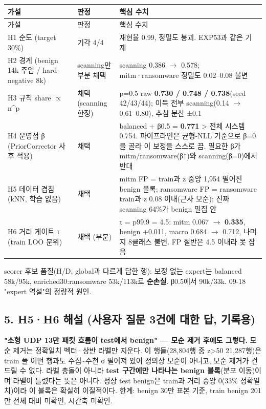 \begingroup
\footnotesize
\begin{longtable}{>{\raggedright\arraybackslash}p{}>{\raggedright\arraybackslash}p{}>{\raggedright\arraybackslash}p{}}
\toprule
가설 & 판정 & 핵심 수치 \\ \midrule
\endfirsthead
가설 & 판정 & 핵심 수치 \\ \midrule
\endhead
{}H1 순도 (target 30\%) & 기각 4/\allowbreak{}4 & 재현율 0.99, 정밀도 붕괴. EXP53과 같은 기제 \\
{}H2 경계 (benign 14k 주입 /\allowbreak{} hard-negative 8k) & scanning만 부분 채택 & scanning 0.386  \ensuremath{\rightarrow}  0.578; mitm·ransomware 정밀도 0.02–0.08 불변 \\
{}H3 규칙 share \ensuremath{\propto} n\textasciicircum{}p & 채택 (scanning 한정) & p=\allowbreak{}0.5 raw \textbf{0.730 /\allowbreak{} 0.748 /\allowbreak{} 0.738}(seed 42/\allowbreak{}43/\allowbreak{}44); 이득 전부 scanning(0.14  \ensuremath{\rightarrow}  0.61–0.80), 추첨 분산 ±0.1 \\
{}H4 운영점 β (PriorCorrector 사후 적용) & 채택 & balanced +\allowbreak{} β0.5 =\allowbreak{} \textbf{0.771} > 전체 시스템 0.754. 파이프라인은 균형-NLL 기준으로 β=\allowbreak{}0을 골라 이 보정을 스스로 끔. 필요한 β가 mitm/\allowbreak{}ransomware(β↑)와 scanning(β=\allowbreak{}0)에서 반대 \\
{}H5 데이터 겹침 (kNN, 학습 없음) & 채택 & mitm FP =\allowbreak{} train과 z 중앙 1,954 떨어진 benign 블록; ransomware FP =\allowbreak{} ransomware train과 z 0.08 이내(근사 모순); 진짜 scanning 64\%가 benign 밀집 안 \\
{}H6 거리 게이트 τ (train LOO 분위) & 채택 (부분) & τ =\allowbreak{} p99.9 =\allowbreak{} 4.5: mitm 0.067  \ensuremath{\rightarrow}  \textbf{0.335}, benign +\allowbreak{}0.011, macro 0.684  \ensuremath{\rightarrow}  0.712, 나머지 8클래스 불변. FP 절반은 4.5 이내라 못 잡음 \\
\bottomrule
\end{longtable}
\endgroup
scorer 후보 품질(H/\allowbreak{}D, global과 다르게 답한 행): 보정 없는 expert는 balanced 58k/\allowbreak{}95k, enriched30:ransomware 53k/\allowbreak{}113k로 \textbf{순손실}. β0.5에서 90k/\allowbreak{}33k. 09-18 "expert 역설"의 정량적 원인.

\subsection{5. H5·H6 해설 (사용자 질문 3건에 대한 답, 기록용)}
\par\noindent \textbullet\enspace \textbf{"소형 UDP 13만 패킷 흐름이 test에서 benign" — 모순 제거 후에도 그렇다.} 모순 제거는 정확일치 벡터·상반 라벨만 지운다. 이 행들(28,804행 중 z>50 21,287행)은 train 풀 어떤 행과도 수십\textasciitilde{}수천 σ 떨어져 있어 정의상 모순이 아니고, 모순 제거가 건드릴 수 없다. 라벨 충돌이 아니라 \textbf{test 구간에만 나타나는 benign 블록}(분포 이동)이며 라벨이 틀렸다는 뜻은 아니다. 정상 test benign은 train과 거리 중앙 0(33\% 정확일치)이라 이 블록은 확실히 이질적이다. 한계: benign 30만 표본 기준, train benign 201만 전체 대비 미확인, 시간축 미확인.


